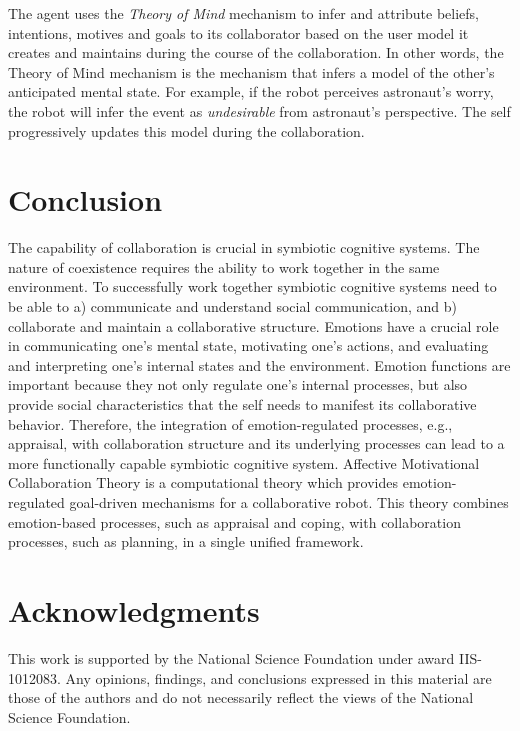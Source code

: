 \documentclass[letterpaper]{article}
\begin{document}
The agent uses the \textit{Theory of Mind} mechanism to infer and attribute
beliefs, intentions, motives and goals to its collaborator based on the user
model it creates and maintains during the course of the collaboration. In
other words, the Theory of Mind mechanism is the mechanism that infers a model
of the other's anticipated mental state. For example, if the robot perceives
astronaut's worry, the robot will infer the event as \textit{undesirable} from
astronaut's perspective. The self progressively updates this model during the
collaboration.

\vspace*{-3mm}
\section{Conclusion}

The capability of collaboration is crucial in symbiotic cognitive systems. The
nature of coexistence requires the ability to work together in the same
environment. To successfully work together symbiotic cognitive systems need to
be able to a) communicate and understand social communication, and b)
collaborate and maintain a collaborative structure. Emotions have a crucial role
in communicating one's mental state, motivating one's actions, and evaluating
and interpreting one's internal states and the environment. Emotion functions
are important because they not only regulate one's internal processes, but also
provide social characteristics that the self needs to manifest its collaborative
behavior. Therefore, the integration of emotion-regulated processes, e.g.,
appraisal, with collaboration structure and its underlying processes can lead to
a more functionally capable symbiotic cognitive system. Affective Motivational
Collaboration Theory is a computational theory which provides emotion-regulated
goal-driven mechanisms for a collaborative robot. This theory combines
emotion-based processes, such as appraisal and coping, with collaboration
processes, such as planning, in a single unified framework.

\vspace*{-3mm}
\section*{Acknowledgments}
\vspace*{-1mm}
This work is supported by the National Science Foundation under award
IIS-1012083. Any opinions, findings, and conclusions expressed in this material
are those of the authors and do not necessarily reflect the views of the
National Science Foundation.
\vspace*{-6mm}



\end{document}
